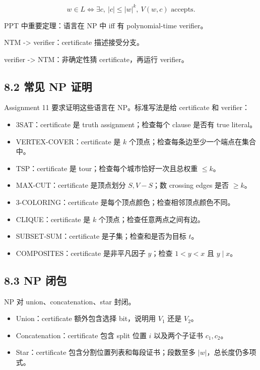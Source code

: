 ﻿\documentclass[UTF8,11pt]{ctexart}
\begin{document}
\[
w\in L\iff \exists c,\ |c|\le |w|^k,\ V(w,c)\text{ accepts}.
\]


PPT 中重要定理：语言在 NP 中 iff 有 polynomial-time verifier。  

NTM -> verifier：certificate 描述接受分支。  

verifier -> NTM：非确定性猜 certificate，再运行 verifier。


\subsection{8.2 常见 NP 证明}


Assignment 11 要求证明这些语言在 NP。标准写法是给 certificate 和 verifier：


\begin{itemize}
\item 3SAT：certificate 是 truth assignment；检查每个 clause 是否有 true literal。
\item VERTEX-COVER：certificate 是 \(k\) 个顶点；检查每条边至少一个端点在集合中。
\item TSP：certificate 是 tour；检查每个城市恰好一次且总权重 \(\le k\)。
\item MAX-CUT：certificate 是顶点划分 \(S,V-S\)；数 crossing edges 是否 \(\ge k\)。
\item 3-COLORING：certificate 是每个顶点颜色；检查相邻顶点颜色不同。
\item CLIQUE：certificate 是 \(k\) 个顶点；检查任意两点之间有边。
\item SUBSET-SUM：certificate 是子集；检查和是否为目标 \(t\)。
\item COMPOSITES：certificate 是非平凡因子 \(y\)；检查 \(1<y<x\) 且 \(y\mid x\)。
\end{itemize}


\subsection{8.3 NP 闭包}


NP 对 union、concatenation、star 封闭。


\begin{itemize}
\item Union：certificate 额外包含选择 bit，说明用 \(V_1\) 还是 \(V_2\)。
\item Concatenation：certificate 包含 split 位置 \(i\) 以及两个子证书 \(c_1,c_2\)。
\item Star：certificate 包含分割位置列表和每段证书；段数至多 \(|w|\)，总长度仍多项式。
\end{itemize}
\end{document}

